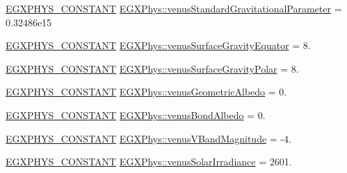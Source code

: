 \begin{DoxyCompactItemize}
\item 
\mbox{\hyperlink{group___e_g_x_phys-_constants-_macros_ga76980d288494ce1714c9ac68a95ba702}{E\+G\+X\+P\+H\+Y\+S\+\_\+\+C\+O\+N\+S\+T\+A\+NT}} \mbox{\hyperlink{group___e_g_x_phys-_constants-_astrophysics-_solar_system-_venus-_bulk_gab8f68b7d2d7e54c1da07518e14d91da1}{E\+G\+X\+Phys\+::venus\+Standard\+Gravitational\+Parameter}} = 0.\+32486e15
\item 
\mbox{\hyperlink{group___e_g_x_phys-_constants-_macros_ga76980d288494ce1714c9ac68a95ba702}{E\+G\+X\+P\+H\+Y\+S\+\_\+\+C\+O\+N\+S\+T\+A\+NT}} \mbox{\hyperlink{group___e_g_x_phys-_constants-_astrophysics-_solar_system-_venus-_bulk_gaa8dbde50f4c15891fa640c713f27d6ff}{E\+G\+X\+Phys\+::venus\+Surface\+Gravity\+Equator}} = 8.
\item 
\mbox{\hyperlink{group___e_g_x_phys-_constants-_macros_ga76980d288494ce1714c9ac68a95ba702}{E\+G\+X\+P\+H\+Y\+S\+\_\+\+C\+O\+N\+S\+T\+A\+NT}} \mbox{\hyperlink{group___e_g_x_phys-_constants-_astrophysics-_solar_system-_venus-_bulk_gae6530375b31eeb2a06adeb17a83e0307}{E\+G\+X\+Phys\+::venus\+Surface\+Gravity\+Polar}} = 8.
\item 
\mbox{\hyperlink{group___e_g_x_phys-_constants-_macros_ga76980d288494ce1714c9ac68a95ba702}{E\+G\+X\+P\+H\+Y\+S\+\_\+\+C\+O\+N\+S\+T\+A\+NT}} \mbox{\hyperlink{group___e_g_x_phys-_constants-_astrophysics-_solar_system-_venus-_bulk_ga96509772a8eb0fd6d6dae81ea65505ed}{E\+G\+X\+Phys\+::venus\+Geometric\+Albedo}} = 0.
\item 
\mbox{\hyperlink{group___e_g_x_phys-_constants-_macros_ga76980d288494ce1714c9ac68a95ba702}{E\+G\+X\+P\+H\+Y\+S\+\_\+\+C\+O\+N\+S\+T\+A\+NT}} \mbox{\hyperlink{group___e_g_x_phys-_constants-_astrophysics-_solar_system-_venus-_bulk_ga95cf1b62650a9263f49fac0123769aab}{E\+G\+X\+Phys\+::venus\+Bond\+Albedo}} = 0.
\item 
\mbox{\hyperlink{group___e_g_x_phys-_constants-_macros_ga76980d288494ce1714c9ac68a95ba702}{E\+G\+X\+P\+H\+Y\+S\+\_\+\+C\+O\+N\+S\+T\+A\+NT}} \mbox{\hyperlink{group___e_g_x_phys-_constants-_astrophysics-_solar_system-_venus-_bulk_ga7c5dfac5db073d6f546b2aa30e4c6566}{E\+G\+X\+Phys\+::venus\+V\+Band\+Magnitude}} = -\/4.
\item 
\mbox{\hyperlink{group___e_g_x_phys-_constants-_macros_ga76980d288494ce1714c9ac68a95ba702}{E\+G\+X\+P\+H\+Y\+S\+\_\+\+C\+O\+N\+S\+T\+A\+NT}} \mbox{\hyperlink{group___e_g_x_phys-_constants-_astrophysics-_solar_system-_venus-_bulk_ga9c4ac12c5a1974a8d2b2308db550aaa3}{E\+G\+X\+Phys\+::venus\+Solar\+Irradiance}} = 2601.
\item 

\end{DoxyCompactItemize}
